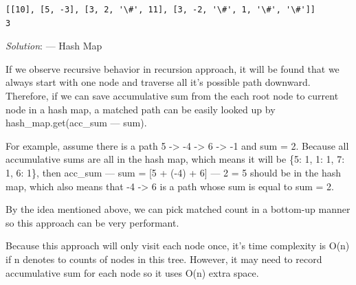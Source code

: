 \documentclass[11pt]{article}
\begin{document}
    \begin{Verbatim}[commandchars=\\\{\}]
[[10], [5, -3], [3, 2, '\#', 11], [3, -2, '\#', 1, '\#', '\#']]
3

    \end{Verbatim}

    \emph{Solution}: --- Hash Map

If we observe recursive behavior in recursion approach, it will be found
that we always start with one node and traverse all it's possible path
downward. Therefore, if we can save accumulative sum from the each root
node to current node in a hash map, a matched path can be easily looked
up by hash\_map.get(acc\_sum --- sum).

For example, assume there is a path 5 -\textgreater{} -4 -\textgreater{}
6 -\textgreater{} -1 and sum = 2. Because all accumulative sums are all
in the hash map, which means it will be \{5: 1, 1: 1, 7: 1, 6: 1\}, then
acc\_sum --- sum = {[}5 + (-4) + 6{]} --- 2 = 5 should be in the hash
map, which also means that -4 -\textgreater{} 6 is a path whose sum is
equal to sum = 2.

By the idea mentioned above, we can pick matched count in a bottom-up
manner so this approach can be very performant.

Because this approach will only visit each node once, it's time
complexity is O(n) if n denotes to counts of nodes in this tree.
However, it may need to record accumulative sum for each node so it uses
O(n) extra space.
\end{document}
